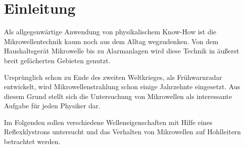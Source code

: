 \section{Einleitung}
\label{sec:einleitung}
Als allgegenwärtige Anwendung von physikalischem Know-How ist die
Mikrowellentechnik kaum noch aus dem Alltag wegzudenken.
Von dem Haushaltsgerät Mikrowelle bis zu Alarmanlagen wird diese Technik
in äußerst breit gefächerten Gebieten genutzt.

Ursprünglich schon zu Ende des zweiten Weltkrieges, als Frühwarnradar
entwickelt, wird Mikrowellenstrahlung schon einige Jahrzehnte eingesetzt.
Aus diesem Grund stellt sich die Untersuchung von Mikrowellen als interessante
Aufgabe für jeden Physiker dar.

Im Folgenden sollen verschiedene Welleneigenschaften mit Hilfe eines
Reflexklystrons untersucht und das Verhalten von Mikrowellen auf Hohlleitern
betrachtet werden.
